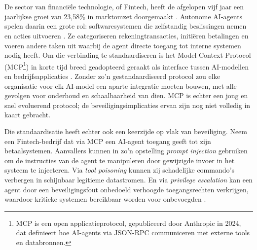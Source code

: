 
\chapter{}%
\label{ch:inleiding}


De sector van financiële technologie, of Fintech, heeft de afgelopen vijf jaar een jaarlijkse groei van 23,58\% in marktomzet doorgemaakt \autocite{statista2024fintechgrowth}. Autonome AI-agents spelen daarin een grote rol: softwaresystemen die zelfstandig beslissingen nemen en acties uitvoeren \autocite{russell2021artificialintelligence}. Ze categoriseren rekeningtransacties, initiëren betalingen en voeren andere taken uit waarbij de agent directe toegang tot interne systemen nodig heeft. Om die verbinding te standaardiseren is het Model Context Protocol (MCP\footnote{MCP is een open applicatieprotocol, gepubliceerd door Anthropic in 2024, dat definieert hoe AI-agents via JSON-RPC communiceren met externe tools en databronnen.}) in korte tijd breed geadopteerd geraakt als interface tussen AI-modellen en bedrijfsapplicaties \autocite{anthropic2024mcpwhitepaper}. Zonder zo'n gestandaardiseerd protocol zou elke organisatie voor elk AI-model een aparte integratie moeten bouwen, met alle gevolgen voor onderhoud en schaalbaarheid van dien. MCP is echter een jong en snel evoluerend protocol; de beveiligingsimplicaties ervan zijn nog niet volledig in kaart gebracht.

Die standaardisatie heeft echter ook een keerzijde op vlak van beveiliging. Neem een Fintech-bedrijf dat via MCP een AI-agent toegang geeft tot zijn betaalsystemen. Aanvallers kunnen in zo'n opstelling \emph{prompt injection} gebruiken om de instructies van de agent te manipuleren door gewijzigde invoer in het systeem te injecteren. Via \emph{tool poisoning} kunnen zij schadelijke commando's verbergen in schijnbaar legitieme datastromen. En via \emph{privilege escalation} kan een agent door een beveiligingsfout onbedoeld verhoogde toegangsrechten verkrijgen, waardoor kritieke systemen bereikbaar worden voor onbevoegden \autocite{song2025protocolunveilingattackvectors}.


